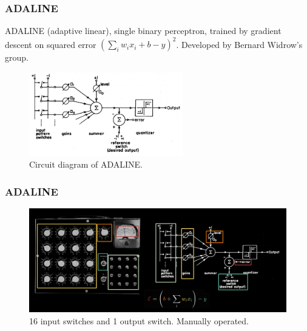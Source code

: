 \documentclass{beamer}
\begin{document}
\begin{frame}
\frametitle{ADALINE}
ADALINE (adaptive linear), single binary perceptron, trained by gradient descent on squared error $(\sum_i w_i x_i + b - y)^2$. Developed by Bernard Widrow's group.

\begin{figure}[t]
    \includegraphics[width=0.6\textwidth]{figure/ADALINE_circuit.png}
    \centering
    \caption{Circuit diagram of ADALINE.}
\end{figure}

\end{frame}

\begin{frame}
\frametitle{ADALINE}
\begin{figure}[t]
    \includegraphics[width=\textwidth]{figure/ADALINE.png}
    \centering
    \caption{16 input switches and 1 output switch. Manually operated.}
\end{figure}
\end{frame}
\end{document}
